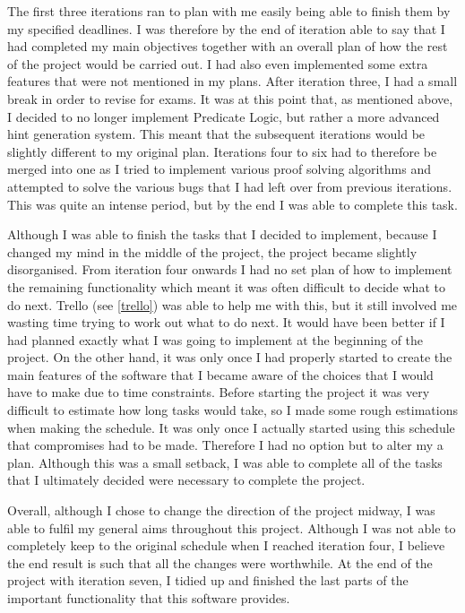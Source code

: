 The first three iterations ran to plan with me easily being able to finish them by my specified deadlines. I was therefore by the end of iteration able to say that I had completed my main objectives together with an overall plan of how the rest of the project would be carried out. I had also even implemented some extra features that were not mentioned in my plans. After iteration three, I had a small break in order to revise for exams. It was at this point that, as mentioned above, I decided to no longer implement Predicate Logic, but rather a more advanced hint generation system. This meant that the subsequent iterations would be slightly different to my original plan. Iterations four to six had to therefore be merged into one as I tried to implement various proof solving algorithms and attempted to solve the various bugs that I had left over from previous iterations. This was quite an intense period, but by the end I was able to complete this task. 

Although I was able to finish the tasks that I decided to implement, because I changed my mind in the middle of the project, the project became slightly disorganised. From iteration four onwards I had no set plan of how to implement the remaining functionality which meant it was often difficult to decide what to do next. Trello (see \ref{trello}) was able to help me with this, but it still involved me wasting time trying to work out what to do next. It would have been better if I had planned exactly what I was going to implement at the beginning of the project. On the other hand, it was only once I had properly started to create the main features of the software that I became aware of the choices that I would have to make due to time constraints. Before starting the project it was very difficult to estimate how long tasks would take, so I made some rough estimations when making the schedule. It was only once I actually started using this schedule that compromises had to be made. Therefore I had no option but to alter my a plan. Although this was a small setback, I was able to complete all of the tasks that I ultimately decided were necessary to complete the project.

Overall, although I chose to change the direction of the project midway, I was able to fulfil my general aims throughout this project. Although I was not able to completely keep to the original schedule when I reached iteration four, I believe the end result is such that all the changes were worthwhile. At the end of the project with iteration seven, I tidied up and finished the last parts of the important functionality that this software provides.

